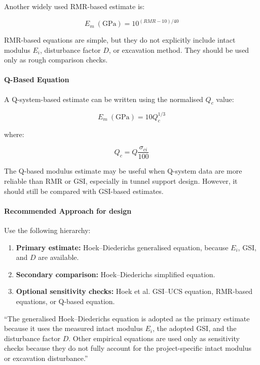 Another widely used RMR-based estimate is:

\[
E_m~(\text{GPa}) =
10^{(RMR-10)/40}
\]

\begin{warnbox}
RMR-based equations are simple, but they do not explicitly include intact modulus
\(E_i\), disturbance factor \(D\), or excavation method. They should be used only as
rough comparison checks.
\end{warnbox}

\paragraph{Q-Based Equation}

A Q-system-based estimate can be written using the normalised \(Q_c\) value:

\[
E_m~(\text{GPa}) =
10Q_c^{1/3}
\]

where:

\[
Q_c =
Q\frac{\sigma_{ci}}{100}
\]

\begin{notebox}
The Q-based modulus estimate may be useful when Q-system data are more reliable than
RMR or GSI, especially in tunnel support design. However, it should still be compared
with GSI-based estimates.
\end{notebox}

\paragraph{Recommended Approach for design}

Use the following hierarchy:

\begin{enumerate}
 \item \textbf{Primary estimate:} Hoek--Diederichs generalised equation, because \(E_i\),
 GSI, and \(D\) are available.
 
 \item \textbf{Secondary comparison:} Hoek--Diederichs simplified equation.
 
 \item \textbf{Optional sensitivity checks:} Hoek et al. GSI--UCS equation,
 RMR-based equations, or Q-based equation.
\end{enumerate}

\begin{keybox}
``The generalised Hoek--Diederichs equation is adopted as the primary estimate because it
uses the measured intact modulus \(E_i\), the adopted GSI, and the disturbance factor
\(D\). Other empirical equations are used only as sensitivity checks because they do not
fully account for the project-specific intact modulus or excavation disturbance.''
\end{keybox}

